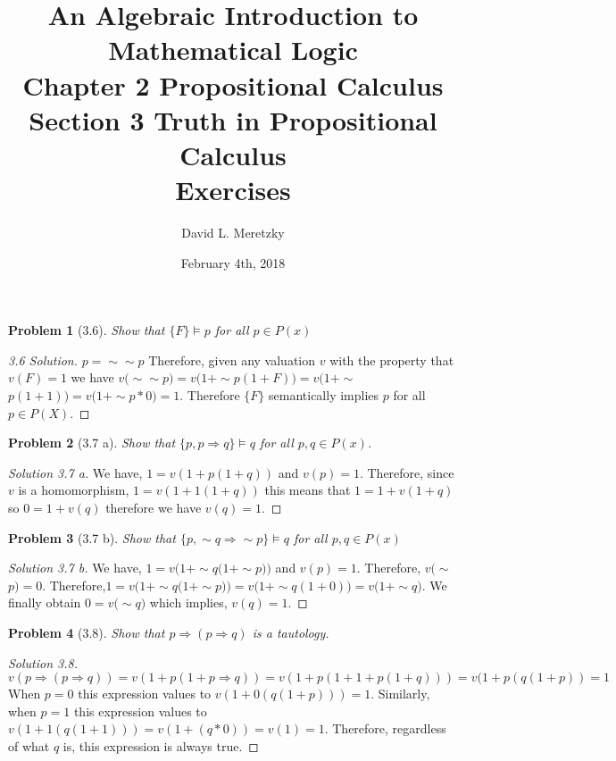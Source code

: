 \documentclass{article}
\title{ \vspace{-10ex} %
An Algebraic Introduction to Mathematical Logic\\
Chapter 2 Propositional Calculus \\
Section 3 Truth in Propositional Calculus \\
Exercises 
}
\author{David L. Meretzky
}
\date{%
February 4th, 2018
}
\theoremstyle{problemstyle}
\newtheorem{problem}{Problem}
\begin{document}
\maketitle

\begin{problem}[3.6] 
Show that $\{F\}\models p$ for all $p \in P(x)$
\end{problem}

\begin{proof}[3.6 Solution]
$p = \sim\sim$$p$
Therefore, given any valuation $v$ with the property that $v(F) = 1$ we have $v(\sim\sim$$p) = v(1+\sim$$p(1+F))=v(1+\sim$$p(1+1)) = v(1+\sim$$p*0) = 1$. Therefore $\{F\}$ semantically implies $p$ for all $p \in P(X)$. 
\end{proof}

\begin{problem}[3.7 a] 
Show that $\{p, p\Rightarrow q\}\models q$ for all $p,q \in P(x)$.
\end{problem}
\begin{proof}[Solution 3.7 a] 
We have, $1 = v(1+p(1+q))$ and $v(p) = 1$. Therefore, since $v$ is a homomorphism, $1 = v(1+1(1+q))$ this means that $1 = 1 + v(1+q)$ so $0 = 1 + v(q)$ therefore we have $v(q) = 1$. 
\end{proof}

\begin{problem}[3.7 b] 
Show that $\{p, \sim$$q\Rightarrow \sim$$p\}\models q$ for all $p,q \in P(x)$
\end{problem}

\begin{proof}[Solution 3.7 b] 
We have, $1 = v(1 + \sim$$q(1+\sim$$p))$ and $v(p) = 1$. Therefore, $v(\sim$$p) = 0$. Therefore,$1 = v(1 + \sim$$q(1+\sim$$p)) = v(1+\sim$$q(1+0)) = v(1+\sim$$q)$. We finally obtain $0 = v(\sim$$q)$ which implies, $v(q) = 1$.
\end{proof}

\begin{problem}[3.8]
Show that $p \Rightarrow (p \Rightarrow q)$ is a tautology. 
\end{problem}
\begin{proof}[Solution 3.8]
$v(p \Rightarrow (p \Rightarrow q)) = v(1+ p(1+ p \Rightarrow q)) = v(1+ p(1+1+p(1+q))) = v(1+p(q(1+p)) = 1$ When $p = 0$ this expression values to $v(1+0(q(1+p))) = 1$. Similarly, when $p = 1$ this expression values to $v(1+1(q(1+1))) = v(1+(q*0)) = v(1) = 1$. Therefore, regardless of what $q$ is, this expression is always true. 
\end{proof}
\end{document}
